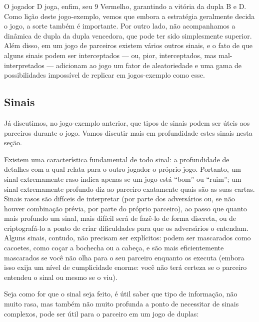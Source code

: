 O jogador D joga, enfim, seu 9 Vermelho, garantindo a vitória da dupla B e D. Como lição deste jogo-exemplo, vemos que embora a estratégia geralmente decida o jogo, a sorte também é importante. Por outro lado, não acompanhamos a dinâmica de dupla da dupla vencedora, que pode ter sido simplesmente superior. Além disso, em um jogo de parceiros existem vários outros sinais, e o fato de que alguns sinais podem ser interceptados --- ou, pior, interceptados, mas mal-interpretados --- adicionam ao jogo um fator de aleatoriedade e uma gama de possibilidades impossível de replicar em jogos-exemplo como esse.

\subsection{Sinais}

Já discutimos, no jogo-exemplo anterior, que tipos de sinais podem ser úteis aos parceiros durante o jogo. Vamos discutir mais em profundidade estes sinais nesta seção.

Existem uma característica fundamental de todo sinal: a profundidade de detalhes com a qual relata para o outro jogador o próprio jogo. Portanto, um sinal extremamente raso indica apenas se um jogo está ``bom'' ou ``ruim''; um sinal extremamente profundo diz ao parceiro exatamente quais são as suas cartas. Sinais rasos são difíceis de interpretar (por parte dos adversários ou, se não houver combinação prévia, por parte do próprio parceiro), ao passo que quanto mais profundo um sinal, mais difícil será de fazê-lo de forma discreta, ou de criptografá-lo a ponto de criar dificuldades para que os adversários o entendam. Alguns sinais, contudo, não precisam ser explícitos: podem ser mascarados como cacoetes, como coçar a bochecha ou a cabeça, e são mais eficientemente mascarados se você não olha para o seu parceiro enquanto os executa (embora isso exija um nível de cumplicidade enorme: você não terá certeza se o parceiro entendeu o sinal ou mesmo se o viu).

Seja como for que o sinal seja feito, é útil saber que tipo de informação, não muito rasa, mas também não muito profunda a ponto de necessitar de sinais complexos, pode ser útil para o parceiro em um jogo de duplas:

